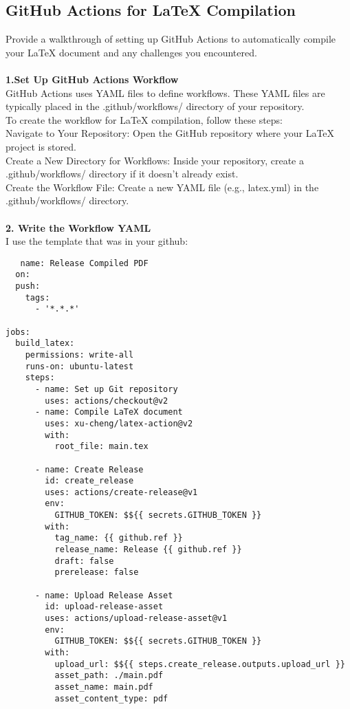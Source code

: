 \documentclass[a4paper,12pt]{article}
\begin{document}
\subsection{GitHub Actions for LaTeX Compilation}
Provide a walkthrough of setting up GitHub Actions to automatically compile your LaTeX document and any challenges you encountered.
\\
\\\textbf{1.Set Up GitHub Actions Workflow}
\\GitHub Actions uses YAML files to define workflows. These YAML files are typically placed in the .github/workflows/ directory of your repository.
\\To create the workflow for LaTeX compilation, follow these steps:
\\Navigate to Your Repository: Open the GitHub repository where your LaTeX project is stored.
\\Create a New Directory for Workflows: Inside your repository, create a .github/workflows/ directory if it doesn’t already exist.
\\Create the Workflow File: Create a new YAML file (e.g., latex.yml) in the .github/workflows/ directory.
\\
\\\textbf{2. Write the Workflow YAML}
\\I use the template that was in your github:
   \begin{verbatim} 
   name: Release Compiled PDF 
  on:
  push:
    tags:
      - '*.*.*'

jobs:
  build_latex:
    permissions: write-all
    runs-on: ubuntu-latest
    steps:
      - name: Set up Git repository
        uses: actions/checkout@v2
      - name: Compile LaTeX document
        uses: xu-cheng/latex-action@v2
        with:
          root_file: main.tex

      - name: Create Release
        id: create_release
        uses: actions/create-release@v1
        env:
          GITHUB_TOKEN: $${{ secrets.GITHUB_TOKEN }}
        with:
          tag_name: {{ github.ref }}
          release_name: Release {{ github.ref }}
          draft: false
          prerelease: false

      - name: Upload Release Asset
        id: upload-release-asset 
        uses: actions/upload-release-asset@v1
        env:
          GITHUB_TOKEN: $${{ secrets.GITHUB_TOKEN }}
        with:
          upload_url: $${{ steps.create_release.outputs.upload_url }} 
          asset_path: ./main.pdf
          asset_name: main.pdf
          asset_content_type: pdf
          \end{verbatim}
\end{document}
